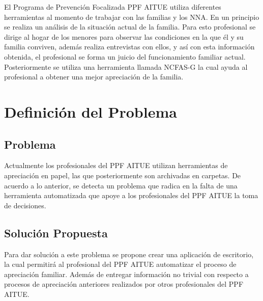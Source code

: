 \documentclass[12pt,letterpaper]{article}
\begin{document}
El Programa de Prevención Focalizada PPF AITUE utiliza diferentes herramientas al momento de trabajar con las familias y los NNA.
En un principio se realiza un análisis de la situación actual de la familia. Para esto profesional se dirige al hogar de los menores para observar las condiciones en la que él y su familia conviven, además realiza entrevistas con ellos, y así con esta información obtenida,  el profesional se forma un juicio del funcionamiento familiar actual.
Posteriormente se utiliza una herramienta llamada NCFAS-G la cual ayuda al profesional a obtener una mejor apreciación de la familia.
 






\section{Definici\'on del Problema}
\label{def}

\subsection{Problema}
Actualmente los profesionales del PPF AITUE utilizan herramientas de apreciación en papel, las que posteriormente son archivadas en carpetas.
De acuerdo a lo anterior, se detecta un problema que radica en la falta de una herramienta automatizada que apoye a los profesionales del PPF AITUE la toma de decisiones. 


\subsection{Soluci\'on Propuesta}


Para dar solución a este problema se propone crear una aplicación de escritorio, la cual permitirá al profesional del PPF AITUE automatizar el proceso de apreciación familiar. Además de entregar información no trivial con respecto a procesos de apreciación anteriores realizados por otros profesionales del PPF AITUE. 
\end{document}
